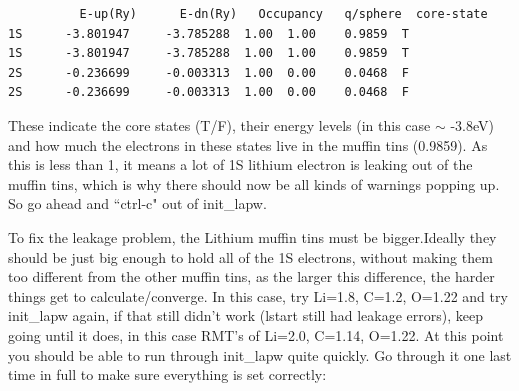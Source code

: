 \documentclass[12pt]{article}
\begin{document}
\begin{itemize}
	\begin{lstlisting}
          E-up(Ry)      E-dn(Ry)   Occupancy   q/sphere  core-state
1S      -3.801947     -3.785288  1.00  1.00    0.9859  T
1S      -3.801947     -3.785288  1.00  1.00    0.9859  T
2S      -0.236699     -0.003313  1.00  0.00    0.0468  F
2S      -0.236699     -0.003313  1.00  0.00    0.0468  F
	\end{lstlisting}
	
	These indicate the core states (T/F), their energy levels (in this case $\sim$ -3.8eV) and how much the electrons in these states live in the muffin tins (0.9859).  As this is less than 1, it means a lot of 1S lithium electron is leaking out of the muffin tins, which is why there should now be all kinds of warnings popping up.  So go ahead and ``ctrl-c" out of init\_lapw.
	
\end{itemize}  

To fix the leakage problem, the Lithium muffin tins must be bigger.Ideally they should be just big enough to hold all of the 1S electrons, without making them too different from the other muffin tins, as the larger this difference, the harder things get to calculate/converge.  In this case, try Li=1.8,  C=1.2, O=1.22 and try init\_lapw again, if that still didn't work (lstart still had leakage errors), keep going until it does, in this case RMT's of Li=2.0,  C=1.14, O=1.22.  At this point you should be able to run through init\_lapw quite quickly.  Go through it one last time in full to make sure everything is set correctly: 
\end{document}
